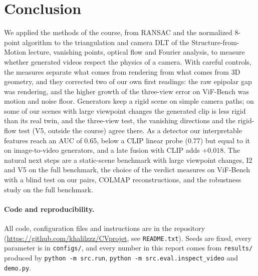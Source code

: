 \documentclass[11pt,a4paper]{article}
\begin{document}
\section{Conclusion}

We applied the methods of the course, from RANSAC and the normalized 8-point algorithm to the
triangulation and camera DLT of the Structure-from-Motion lecture, vanishing points, optical
flow and Fourier analysis, to measure whether generated videos respect the physics of a
camera. With careful controls, the measures separate what comes from rendering from what
comes from 3D geometry, and they corrected two of our own first readings: the raw epipolar
gap was rendering, and the higher growth of the three-view error on ViF-Bench was motion and
noise floor. Generators keep a rigid scene on simple camera paths; on some of our scenes with
large viewpoint changes the generated clip is less rigid than its real twin, and the
three-view test, the vanishing directions and the rigid-flow test (V5, outside the course)
agree there. As a detector our interpretable features reach an AUC of 0.65, below a CLIP linear
probe (0.77) but equal to it on image-to-video generators, and a late fusion with CLIP adds
$+0.018$. The natural next steps are a static-scene benchmark with large viewpoint changes,
I2 and V5 on the full benchmark, the choice of the verdict measures on ViF-Bench with a blind
test on our pairs, COLMAP reconstructions, and the robustness study on the full benchmark.

\paragraph{Code and reproducibility.}
All code, configuration files and instructions are in the repository
(\url{https://github.com/khalilzzz/CVprojet}, see \texttt{README.txt}). Seeds are fixed, every
parameter is in \texttt{configs/}, and every number in this report comes from
\texttt{results/} produced by \texttt{python -m src.run}, \texttt{python -m src.eval.inspect\_video}
and \texttt{demo.py}.




\end{document}
